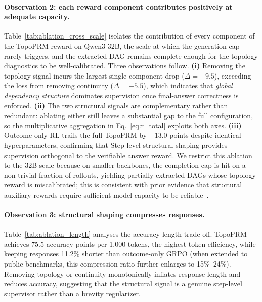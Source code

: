 

\paragraph{Observation 2: each reward component contributes positively at adequate capacity.}
Table~\ref{tab:ablation_cross_scale} isolates the contribution of every component of the TopoPRM reward on \mbox{Qwen3-32B}, the scale at which the generation cap rarely triggers, and the extracted DAG remains complete enough for the topology diagnostics to be well-calibrated. Three observations follow. \textbf{(i)} Removing the topology signal incurs the largest
single-component drop ($\Delta=-9.5$), exceeding the loss from removing continuity ($\Delta=-5.5$), which indicates that \emph{global dependency structure} dominates supervision once final-answer correctness is enforced.
\textbf{(ii)} The two structural signals are complementary rather than
redundant: ablating either still leaves a substantial gap to the full
configuration, so the multiplicative aggregation in Eq.~\ref{eq:r_total} exploits both axes. \textbf{(iii)} Outcome-only RL trails the full TopoPRM by $-13.0$ points despite identical hyperparameters, confirming that Step-level structural shaping provides supervision orthogonal to the verifiable answer reward. We restrict this ablation to the 32B scale because on smaller backbones, the completion cap is hit on a non-trivial fraction of rollouts, yielding partially-extracted DAGs whose topology reward is miscalibrated; this is consistent with prior evidence that structural
auxiliary rewards require sufficient model capacity to be
reliable~\citep{liu2026graph,yu2025dapo}.



\paragraph{Observation 3: structural shaping compresses responses.}
Table~\ref{tab:ablation_length} analyses the accuracy-length trade-off.
TopoPRM achieves 75.5 accuracy points per 1,000 tokens, the highest token efficiency, while keeping responses 11.2\% shorter than outcome-only GRPO (when extended to public benchmarks, this compression ratio further enlarges to 15\%--24\%). %
Removing topology or continuity monotonically inflates response length and reduces accuracy, suggesting that the structural signal is a genuine step-level supervisor rather than a brevity regularizer.

